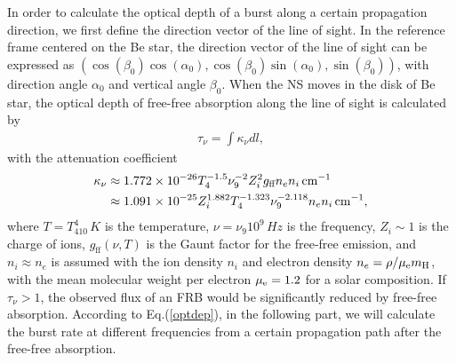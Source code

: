 \documentclass[twocolumn]{aastex62}
\begin{document}
In order to calculate the optical depth of a burst along a certain propagation direction, we first define the direction vector of the line of sight. In the reference frame centered on the Be star, the direction vector of the line of sight can be expressed as $(\cos(\beta_0) \cos(\alpha_0),  \cos(\beta_0) \sin(\alpha_0),  \sin(\beta_0))$, with direction angle $\alpha_0$ and vertical angle $\beta_0$. When the NS moves in the disk of Be star, the optical depth of free-free absorption along the line of sight is calculated by
\begin{eqnarray}
\tau_{\nu} = \int  \kappa_{\nu} d l,\label{optdep}
\end{eqnarray}
with the attenuation coefficient \citep[e.g.,][]{dra11}
\begin{align}
\kappa_{\nu} &\approx 1.772 \times 10^{-26} T_{4}^{-1.5} \nu_9 ^{-2}Z_{i}^2 g_{\text{ff}} n_{e} n_{i} \,\unit{cm}^{-1} \notag\\
&\approx 1.091 \times 10^{-25} Z_{i}^{1.882} T_{4}^{-1.323} \nu_{9}^{-2.118} n_{e} n_{i} \,\unit{cm}^{-1},
\end{align}
where $T=T_410^4\,\unit{K}$ is the temperature, $\nu = \nu_9 10^9 \,\unit{Hz}$ is the frequency, $Z_i \sim 1$ is the charge of ions, $g_{\text{ff}}(\nu, T)$ is the Gaunt factor for the free-free emission, and $n_i \approx n_e$ is assumed with the ion density $n_i$ and electron density $n_e= \rho/\mu_{\rm e} m_{\rm H}$, with the mean molecular weight per electron $\mu_{\rm e}=1.2$ for a solar composition. 
If $\tau_\nu>1$, the observed flux of an FRB would be significantly reduced by free-free absorption.
According to Eq.(\ref{optdep}), in the following part, we will calculate the burst rate at different frequencies from a certain propagation path after the free-free absorption.
\end{document}
